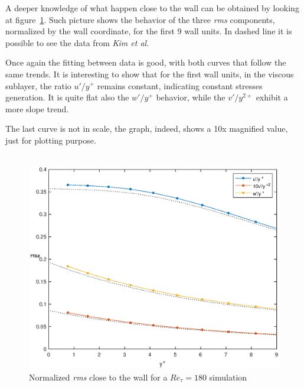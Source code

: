 A deeper knowledge of what happen close to the wall can be obtained by looking at figure~\ref{wall:rms:180}.
Such picture shows the behavior of the three \emph{rms} components, normalized by the wall coordinate, for the first 9 wall units. In dashed line it is possible to see the data from \emph{Kim et al.} \par
Once again the fitting between data is good, with both curves that follow the same trends.
It is interesting to show that for the first wall units, in the viscous sublayer, the ratio $u'/y^{+}$ remains constant, indicating constant stresses generation. It is quite flat also the $w'/y^{+}$ behavior, while the $v'/y^{2+}$ exhibit a more slope trend.\par
The last curve is not in scale, the graph, indeed, shows a 10x magnified value, just for plotting purpose.\\~\par

\begin{figure}
\begin{center}
\includegraphics[scale=0.55]{grafici/wall_rms_180.eps}
\caption{Normalized \emph{rms} close to the wall for a $Re_{\tau}=180$ simulation}
\label{wall:rms:180}
\end{center} 
\end{figure}

